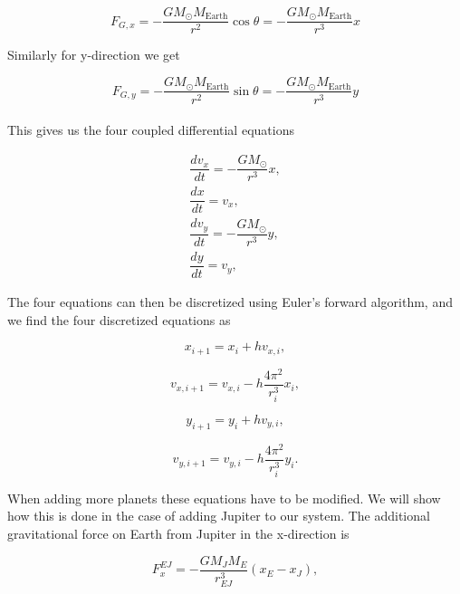 \documentclass[a4paper, fontsize=11pt]{article}
\begin{document}
\begin{equation}
F_{G,x}=-\dfrac{GM_{\odot} M_{\text{Earth}}}{r^2} \cos \theta = - \dfrac{G M_{\odot} M_{\text{Earth}}}{r^3} x
\end{equation}

Similarly for y-direction we get

\begin{equation}
F_{G,y}=-\dfrac{GM_{\odot} M_{\text{Earth}}}{r^2} \sin \theta = - \dfrac{G M_{\odot} M_{\text{Earth}}}{r^3} y
\end{equation}
 

\paragraph{}
This gives us the four coupled differential equations 

\begin{align}
\dfrac{dv_{x}}{dt}=-\dfrac{G M_{\odot}}{r^3}x, \\
\dfrac{dx}{dt} = v_{x}, \\
\dfrac{dv_{y}}{dt}=-\dfrac{G M_{\odot}}{r^3}y, \\
\dfrac{dy}{dt} = v_{y},
\end{align}


The four equations can then be discretized using Euler's forward algorithm, and we find the four discretized equations as

\begin{equation}
x_{i+1} = x_{i} + h v_{x,i},
\end{equation}

\begin{equation}
v_{x,i+1} = v_{x,i} - h \dfrac{4 \pi^2}{r_{i}^3}x_{i},
\end{equation}


\begin{equation}
y_{i+1} = y_{i} + h v_{y,i},
\end{equation}

\begin{equation}
v_{y,i+1} = v_{y,i} - h \dfrac{4 \pi^2}{r_{i}^3}y_{i}.
\end{equation}

When adding more planets these equations have to be modified. We will show how this is done in the case of adding Jupiter to our system. The additional gravitational force on Earth from Jupiter in the x-direction is 

\begin{equation}
F_{x}^{EJ} = -\dfrac{G M_{J} M_{E}}{r^3_{EJ}}(x_{E} - x_{J}),
\end{equation}
\end{document}

